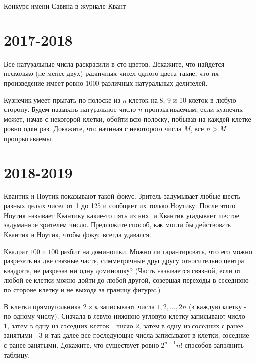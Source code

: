 \documentclass[11pt, a4paper]{common/document_template}
\begin{document}
\begin{titlepage}
  \begin{center}
	\Huge{Конкурс имени Савина в журнале Квант}
  \end{center}
\end{titlepage} 

\chapter{2017-2018}

\begin{exercise}[7]
Все натуральные числа раскрасили в сто цветов. Докажите, что найдется несколько (не менее двух) различных чисел одного цвета такие, что их произведение имеет ровно 1000 различных натуральных делителей.
\end{exercise}

\begin{exercise}
Кузнечик умеет прыгать по полоске из $n$ клеток на 8, 9 и 10 клеток в любую сторону. Будем называть натуральное число $n$ пропрыгиваемым, если кузнечик может, начав с некоторой клетки, обойти всю полоску, побывав на каждой клетке ровно один раз. Докажите, что начиная с некоторого числа $M$, все $n > M$ пропрыгиваемы.
\end{exercise}

\chapter{2018-2019}

\begin{exercise}[3]
Квантик и Ноутик показывают такой фокус. Зритель задумывает любые шесть разных целых чисел от 1 до 125 и сообщает их только Ноутику. После этого Ноутик называет Квантику какие-то пять из них, и Квантик угадывает шестое задуманное зрителем число. Предложите способ, как могли бы действовать Квантик и Ноутик, чтобы фокус всегда удавался.
\end{exercise}

\begin{exercise}[4]
Квадрат $100 \times 100$ разбит на доминошки. Можно ли гарантировать, что его можно разрезать на две связные части, симметричные друг другу относительно центра квадрата, не разрезав ни одну доминошку? (Часть называется связной, если от любой ее клетки можно дойти до любой другой, совершая переходы в соседнюю по стороне клетку и не выходя за границу фигуры.)
\end{exercise}

\begin{exercise}
В клетки прямоугольника $2 \times n$ записывают числа $1, 2, \dots, 2n$ (в каждую клетку - по одному числу). Сначала в левую нижнюю угловую клетку записывают число 1, затем в одну из соседних
клеток - число 2, затем в одну из соседних с ранее занятыми - 3 и так далее все последующие числа записывают в клетки, соседние с ранее занятыми. Докажите, что существует ровно $2^{n - 1} n!$ способов
заполнить таблицу.
\end{exercise}
\end{document}
